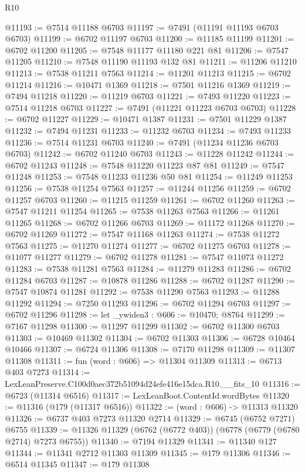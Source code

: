 \begin{lexlean}{R10}
\begin{coremodule}
@11193 := @7514 @11188 @6703
@11197 := @7491 (@11191 @11193 @6703 @6703)
@11199 := @6702 @11197 @6703
@11200 := @11185 @11199
@11201 := @6702 @11200
@11205 := @7548 @11177 @11180 @221 @81
@11206 := @7547 @11205
@11210 := @7548 @11190 @11193 @132 @81
@11211 := @11206 @11210
@11213 := @7538 @11211 @7563
@11214 := @11201 @11213
@11215 := @6702 @11214
@11216 := @10471 @1369
@11218 := @7501 @11216 @1369
@11219 := @7494 @11218
@11220 := @11219 @6703
@11221 := @7493 @11220
@11223 := @7514 @11218 @6703
@11227 := @7491 (@11221 @11223 @6703 @6703)
@11228 := @6702 @11227
@11229 := @10471 @1387
@11231 := @7501 @11229 @1387
@11232 := @7494 @11231
@11233 := @11232 @6703
@11234 := @7493 @11233
@11236 := @7514 @11231 @6703
@11240 := @7491 (@11234 @11236 @6703 @6703)
@11242 := @6702 @11240 @6703
@11243 := @11228 @11242
@11244 := @6702 @11243
@11248 := @7548 @11220 @11223 @87 @81
@11249 := @7547 @11248
@11253 := @7548 @11233 @11236 @50 @81
@11254 := @11249 @11253
@11256 := @7538 @11254 @7563
@11257 := @11244 @11256
@11259 := @6702 @11257 @6703
@11260 := @11215 @11259
@11261 := @6702 @11260
@11263 := @7547 @11211 @11254
@11265 := @7538 @11263 @7563
@11266 := @11261 @11265
@11268 := @6702 @11266 @6703
@11269 := @11172 @11268
@11270 := @6702 @11269
@11272 := @7547 @11168 @11263
@11274 := @7538 @11272 @7563
@11275 := @11270 @11274
@11277 := @6702 @11275 @6703
@11278 := @11077 @11277
@11279 := @6702 @11278
@11281 := @7547 @11073 @11272
@11283 := @7538 @11281 @7563
@11284 := @11279 @11283
@11286 := @6702 @11284 @6703
@11287 := @10878 @11286
@11288 := @6702 @11287
@11290 := @7547 @10874 @11281
@11292 := @7538 @11290 @7563
@11293 := @11288 @11292
@11294 := @7250 @11293
@11296 := @6702 @11294 @6703
@11297 := @6702 @11296
@11298 := let _ywiden3 : @606 := @10470; @8764
@11299 := @7167 @11298
@11300 := @11297 @11299
@11302 := @6702 @11300 @6703
@11303 := @10469 @11302
@11304 := @6702 @11303
@11306 := @6728 @10464 @10466
@11307 := @6724 @11306
@11308 := @7170 @11298
@11309 := @11307 @11308
@11311 := fun (word : @606) => @11304 @11309
@11313 := @6713 @403 @7273
@11314 := LexLeanPreserve.C100d0aec372b51094d24efe416e15dca.R10.__fits_10
@11316 := @6723 (@11314 @6516)
@11317 := LexLeanBoot.ContentId.wordBytes
@11320 := @11316 (@179 (@11317 @6516))
@11322 := (word : @606) -> @11313 @11320
@11326 := @6737 @403 @7273 @11320 @2714
@11329 := @6745 (@6752 @7271) @6755
@11339 := @11326 @11329 (@6762 (@6772 @403)) (@6778 (@6779 (@6780 @2714) @7273 @6755))
@11340 := @7194 @11329
@11341 := @11340 @127
@11344 := @11341 @2712 @11303 @11309
@11345 := @179 @11306
@11346 := @6514 @11345
@11347 := @179 @11308

\end{coremodule}
\end{lexlean}
